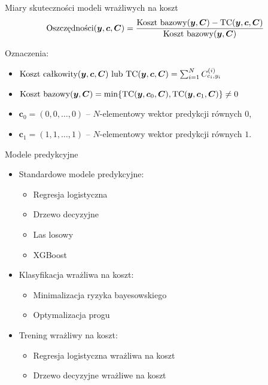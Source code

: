 \documentclass{beamer}
\begin{document}
\begin{frame}{Miary skuteczności modeli wrażliwych na koszt}
	$$ \text{Oszczędności}(\boldsymbol{y}, \boldsymbol{c}, \boldsymbol{C}) = \frac{\text{Koszt bazowy}(\boldsymbol{y}, \boldsymbol{C}) - \text{TC}(\boldsymbol{y}, \boldsymbol{c}, \boldsymbol{C})}{\text{Koszt bazowy}(\boldsymbol{y}, \boldsymbol{C})} $$
	
	\vspace{0.7cm}
	Oznaczenia:
	\begin{itemize}
		\item $ \text{Koszt całkowity}(\boldsymbol{y}, \boldsymbol{c}, \boldsymbol{C}) \text{ lub } \text{TC}(\boldsymbol{y}, \boldsymbol{c}, \boldsymbol{C})= \sum_{i=1}^N C^{(i)}_{c_i,y_i} $
		\item $ \text{Koszt bazowy}(\boldsymbol{y}, \boldsymbol{C}) = \min\{\text{TC}(\boldsymbol{y}, \boldsymbol{c}_0, \boldsymbol{C}), \text{TC}(\boldsymbol{y}, \boldsymbol{c}_1, \boldsymbol{C})\} \neq 0$
		\item $\boldsymbol{c}_0 = (0, 0, \dots, 0)$ -- $N$-elementowy wektor predykcji równych $0$,
		\item $\boldsymbol{c}_1 = (1, 1, \dots, 1)$ -- $N$-elementowy wektor predykcji równych $1$.

	\end{itemize}
\end{frame}

\begin{frame}{Modele predykcyjne}
	\begin{itemize}
		\item Standardowe modele predykcyjne:
		\begin{itemize}
			\item Regresja logistyczna
			\item Drzewo decyzyjne
			\item Las losowy
			\item XGBoost
		\end{itemize}
		\item Klasyfikacja wrażliwa na koszt:
		\begin{itemize}
			\item Minimalizacja ryzyka bayesowskiego
			\item Optymalizacja progu
		\end{itemize}
		\item Trening wrażliwy na koszt:
		\begin{itemize}
			\item Regresja logistyczna wrażliwa na koszt
			\item Drzewo decyzyjne wrażliwe na koszt
		\end{itemize}
	\end{itemize}
\end{frame}
\end{document}
